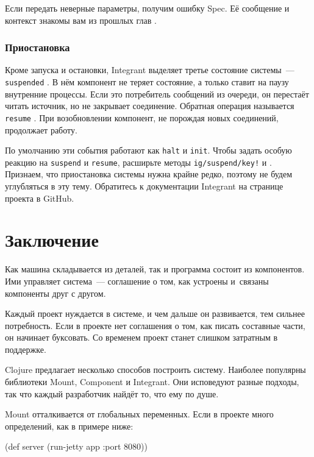 \fi

\fi

Если передать неверные параметры, получим ошибку Spec. Её сообщение и контекст
знакомы вам из прошлых глав .

\subsubsection{Приостановка}


Кроме запуска и остановки, Integrant выделяет третье состояние системы~---
\verb|suspended| . В нём компонент не теряет состояние, а
только ставит на паузу внутренние процессы. Если это потребитель сообщений из
очереди, он перестаёт читать источник, но не закрывает соединение. Обратная
операция называется \verb|resume| . При возобновлении
компонент, не порождая новых соединений, продолжает работу.

По умолчанию эти события работают как \verb|halt| и \verb|init|. Чтобы задать
особую реакцию на \verb|suspend| и \verb|resume|, расширьте методы
\texttt{ig/suspend\-/key!} и . Признаем, что приостановка
системы нужна крайне редко, поэтому не будем углубляться в эту тему. Обратитесь
к документации Integrant на странице проекта в GitHub.

\section{Заключение}

Как машина складывается из деталей, так и программа состоит из компонентов. Ими
управляет система~--- соглашение о том, как устроены и~связаны компоненты друг с
другом.

Каждый проект нуждается в системе, и чем дальше он развивается, тем сильнее
потребность. Если в проекте нет соглашения о том, как писать составные части, он
начинает буксовать. Со временем проект станет слишком затратным в поддержке.

Clojure предлагает несколько способов построить систему. Наиболее популярны
библиотеки Mount, Component и Integrant. Они исповедуют разные подходы, так что
каждый разработчик найдёт то, что ему по душе.

Mount отталкивается от глобальных переменных. Если в проекте много определений,
как в примере ниже:

\ifnarrow

\begin{english}
  \begin{clojure}
(def server
  (run-jetty app {:port 8080}))
  \end{clojure}
\end{english}

